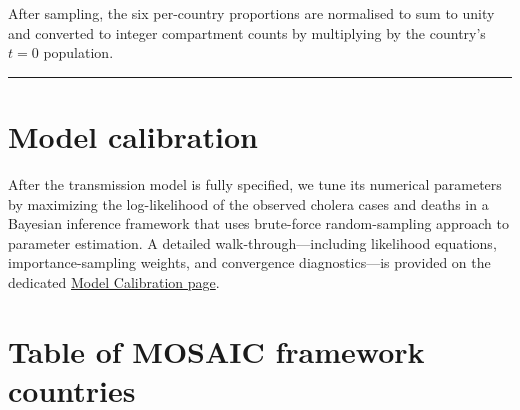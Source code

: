 \documentclass[
]{book}
\begin{document}
After sampling, the six per-country proportions are normalised to sum to unity and converted to integer compartment counts by multiplying by the country's \(t = 0\) population.

\begin{center}\rule{0.5\linewidth}{0.5pt}\end{center}

\section{Model calibration}\label{model-calibration}

After the transmission model is fully specified, we tune its numerical parameters by maximizing the log-likelihood of the observed cholera cases and deaths in a Bayesian inference framework that uses brute-force random-sampling approach to parameter estimation. A detailed walk-through---including likelihood equations, importance-sampling weights, and convergence diagnostics---is provided on the dedicated \href{https://www.mosaicmod.org/model-calibration-1.html}{Model Calibration page}.

\label{mosaic-table}

\section{Table of MOSAIC framework countries}\label{table-of-mosaic-framework-countries}
\end{document}
